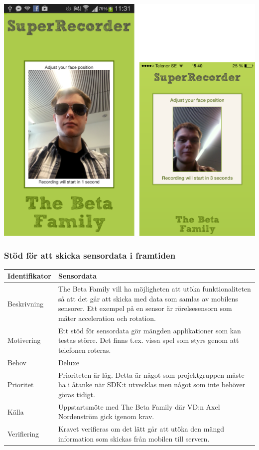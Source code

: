 \includegraphics[scale=0.5]{comp3.png}

\subsubsection{Stöd för att skicka sensordata i framtiden}
\begin{tabular}{ | p{65pt} | p{300pt} |}
  \hline
  Identifikator &
  Sensordata
  \\ \hline
  Beskrivning & 
  The Beta Family vill ha möjligheten att utöka funktionaliteten så att det går att skicka med data som samlas av mobilens sensorer. Ett exempel på en sensor är rörelsesensorn som mäter acceleration och rotation.
  \\ \hline
  Motivering &
  Ett stöd för sensordata gör mängden applikationer som kan testas större. Det finns t.ex. vissa spel som styrs genom att telefonen roteras.
  \\ \hline
  Behov &
  Deluxe
  \\ \hline
  Prioritet &
  Prioriteten är låg. Detta är något som projektgruppen måste ha i åtanke när SDK:t utvecklas men något som inte behöver göras tidigt.
  \\ \hline
  Källa &
  Uppstartsmöte med The Beta Family där VD:n Axel Nordenström gick igenom krav.
  \\ \hline
  Verifiering &
  Kravet verifieras om det lätt går att utöka den mängd information som skickas från mobilen till servern.
  \\ \hline
\end{tabular}


